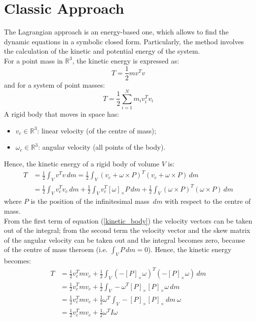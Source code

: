 \documentclass[a4paper,12pt,oneside]{report}
\begin{document}
\section{Classic Approach}
The Lagrangian approach is an energy-based one, which allows to find the dynamic equations in a symbolic closed form. Particularly, the method involves the calculation of the kinetic and potential energy of the system.\\
For a point mass in $\mathbb{R} ^3$, the kinetic energy is expressed as:
\begin{equation}
  T=\frac{1}{2}mv^Tv
\end{equation}
and for a system of point masses:
\begin{equation}
  T=\frac{1}{2}\sum_{i=1}^N m_iv_i^Tv_i
\end{equation}
A rigid body that moves in space has:
\begin{itemize}
  \item $v_c \in \mathbb{R} ^3$: linear velocity (of the centre of mass);
  \item $\omega_c \in \mathbb{R} ^3$: angular velocity (all points of the body).
\end{itemize}
Hence, the kinetic energy of a rigid body of volume $V$ is:
\begin{equation}
  \begin{split}
  T&=\frac{1}{2}\int_{V}v^Tv\,dm=\frac{1}{2}\int_{V}(v_c+\omega\times P)^T(v_c+\omega \times P)\,dm\\
  & =\frac{1}{2}\int_{V}v_c^Tv_c\,dm+\frac{1}{2}\int_{V}v_c^T[\omega]_{\times}P\,dm+\frac{1}{2}\int_{V}(\omega \times P)^T(\omega \times P)\,dm
\end{split}
\label{kinetic_body}
\end{equation}
where $P$ is the position of the infinitesimal mass $\,dm$ with respect to the centre of mass.\\
From the first term of equation (\ref{kinetic_body}) the velocity vectors can be taken out of the integral; from the second term the velocity vector and the skew matrix of the angular velocity can be taken out and the integral becomes zero, because of the centre of mass theroem (i.e. $\int_{V}P\,dm=0$). Hence, the kinetic energy becomes:
\begin{equation}
  \begin{split}
    T&=\frac{1}{2}v_c^Tmv_c+\frac{1}{2}\int_{V}(-[P]_{\times}\omega)^T(-[P]_{\times}\omega)\,dm\\
    &=\frac{1}{2}v_c^Tmv_c+\frac{1}{2}\int_{V}-\omega^T[P]_{\times}[P]_{\times}\omega\,dm\\
    &=\frac{1}{2}v_c^Tmv_c+\frac{1}{2}\omega^T\int_{V}-[P]_{\times}[P]_{\times}\,dm \ \omega\\
    &=\frac{1}{2}v_c^Tmv_c+\frac{1}{2}\omega^T I \omega
  \end{split}
  \label{final_kinetic_body}
\end{equation}
\end{document}
